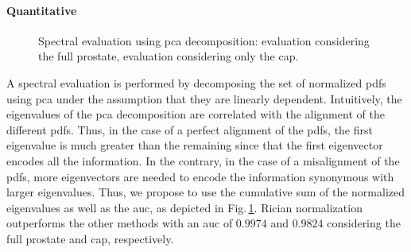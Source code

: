 \paragraph{Quantitative}

\begin{figure}
  \centering
  \hfill
  \caption{Spectral evaluation using \ac{pca} decomposition: \protect{} evaluation considering the full prostate, \protect{} evaluation considering only the \ac{cap}.}
  \label{fig:qt}
\end{figure}

A spectral evaluation is performed by decomposing the set of normalized \ac{pdf}s using \ac{pca} under the assumption that they are linearly dependent. 
Intuitively, the eigenvalues of the \ac{pca} decomposition are correlated with the alignment of the different \ac{pdf}s.
Thus, in the case of a perfect alignment of the \ac{pdf}s, the first eigenvalue is much greater than the remaining since that the first eigenvector encodes all the information.
In the contrary, in the case of a misalignment of the \ac{pdf}s, more eigenvectors are needed to encode the information synonymous with larger eigenvalues.
Thus, we propose to use the cumulative sum of the normalized eigenvalues as well as the \ac{auc}, as depicted in Fig.\,\ref{fig:qt}.
Rician normalization outperforms the other methods with an \ac{auc} of $0.9974$ and $0.9824$ considering the full prostate and \ac{cap}, respectively.

